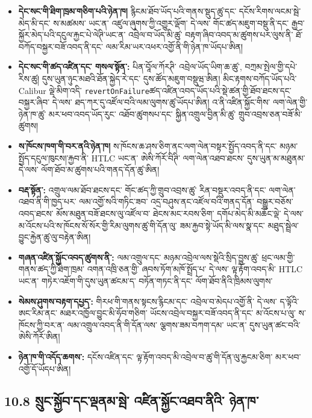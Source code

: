 \documentclass[11pt]{article}
\begin{document}
\begin{itemize}[leftmargin=*]
\item \textbf{དེང་སང་གི་ཐིག་ཁྲམ་གཅིག་པའི་ཉེན་ཁ།} རྙིངམ་ཐོབ་ཡོད་པའི་གནས་སྡུད་ཚུ་དང་ དངོས་རིགས་ལངམ་སྦེ་མེད་མི་དང་ ས་མཚམས་ ཡང་ན་ འཛུལ་ཞུགས་ཀྱི་འགྱུར་ལྡོག་ དེ་ལས་ གོང་ཚད་མཇུག་བསྡུ་ནི་དང་ རྒྱབ་སྐྱོར་མེད་པའི་དངུལ་རྐྱང་པེ་ལེཊི་ཡང་ན་ འབྲེལ་བ་ཡོད་མི་ཚུ་ བརྟག་ཞིབ་འབད་མ་ཚུགས་པར་ལུས་ནི་ ཐོ་བཀོད་བསྐྱར་བཟོ་འབད་ནི་དང་ ལམ་རིམ་ཡར་འཕར་འགྱོ་ནི་གི་ཉེན་ཁ་ཡོདཔ་ཨིན།
\item \textbf{དེང་སང་གི་ཚད་འཛིན་དང་ གསལ་སྟོན་:} པིན་བཱོལ་ཀོརཊི་ འབྲེལ་ཡོད་ཡིག་ཆ་ཚུ་, བཀྲམ་སྤེལ་གྱི་དཔེ་རིས་ཚུ། དུས་ཡུན་ཉུང་མཐའི་ཐོན་སྐྱེད་རེ་དང་ དུས་ཚོད་མཇུག་བསྡུཝ་ཨིན། མིང་རྟགས་བཀོད་ཡོད་པའི་ Calibur ལྡེ་མིག་འདི་ \texttt{revertOnFailure}ཚད་འཛིན་འབད་ཡོད་པའི་སྡེ་ཚན་གྱི་ཐོབ་ཐངས་དང་ བསྐྱར་ཞིབ་ དེ་ལས་ ཐད་ཀར་དུ་འཛོལ་བའི་ལམ་ལུགས་ཚུ་ཡོདཔ་ཨིན། འ་ནི་འཛིན་སྐྱོང་གིས་ ལག་ལེན་གྱི་ཉེན་ཁ་ཚུ་ མར་ཕབ་འབད་ཡོད་རུང་ འཐོབ་ཚུགསཔ་དང་ སྐྱིན་འགྲུལ་བྱིན་མི་ཚུ་ གྲུབ་འབྲས་ཅན་བཟོ་མི་ཚུགས།
\item \textbf{ས་ཁོངས་ཁག་གི་བར་ནའི་ཉེན་ཁ།} ས་ཁོངས་ཆ་ཤས་ཅིག་ནང་ལག་ལེན་བསྟར་སྤྱོད་འབད་ནི་དང་ མཉམ་སྤྱོད་དངུལ་ཁུངས།་རྐྱབ་ནི་ HTLC ཡང་ན་ ཨེསི་ཀོརོ་བིཊི་ ལག་ལེན་འཐབ་ཐངས་ དུས་ཡུན་མ་མཐུནམ་ དེ་ལས་ ལོག་ཐོབ་མ་ཚུགས་པའི་གནད་དོན་ཚུ་ཨིན།
\item \textbf{བརྡ་སྟོན་:} འགྲུལ་ལམ་ཐོབ་ཐངས་དང་ གོང་ཚད་ཀྱི་གྲུབ་འབྲས་ཚུ་ རིན་བསྡུར་འབད་ནི་དང་ ལག་ལེན་འཐབ་ནི་གི་ཁྱད་པར་ ལམ་འགྱོ་སའི་གཏིང་ཟབ་ འདྲ་བཤུས་ནང་འཛོལ་བའི་གནད་དོན་ བསྒྱུར་བཅོས་འབད་ཐངས་ མོས་མཐུན་བཟོ་ཐངས་ལུ་འཛོལ་བ་ ཐེངས་མང་རབས་ཅིག་ དགོཔ་མེད་མི་མཆོང་ལྡེ་ དེ་ལས་ མ་འོངས་པའི་ས་ཁོངས་སོ་སོར་གྱི་རིམ་ལུགས་ཚུ་གི་དོན་ལུ་ ཟམ་རྐྱབ་སྟེ་ཡོད་མི་ལས་སྣ་དང་ མཐུད་སྦྲེལ་བྱུང་རྐྱེན་ཚུ་ལུ་བརྟེན་ཨིན།
\item \textbf{གཞན་འཛིན་སྐྱོང་འབད་ཚུགས་ནི་:} ལམ་འགྲུལ་དང་ མཉམ་འབྲེལ་ལས་སྡེའི་སྲིད་བྱུས་ཚུ་ ཕྲང་ལམ་གྱི་གནས་ཚད་ཀྱི་ཐིག་ཁྲམ་ འགན་འཁྲི་ཅན་གྱི་ ཞབས་ཏོག་མཁོ་སྤྲོད་པ་ དེ་ལས་ ལྟ་རྟོག་འབད་མི་ HTLC ཡང་ན་ གཏེར་འཇོག་གི་དུས་ཡུན་ཚངམ་ད་ བཏོན་གཏང་ནི་དང་ ལོག་ཐོབ་ནིའི་ཁྲིམས་ལུགས་
\item \textbf{སེམས་ཤུགས་བརྟག་དཔྱད་:} གིརཕ་གི་གནས་སྟངས་རྙིངམ་དང་ འབྲེལ་བ་མེདཔ་འགྱོ་ནི་ དེ་ལས་ ད་ལྟོའི་ཨང་རིམ་ནང་ མཐར་འཁྱོལ་བྱུང་མི་ཧོབ་གཅིག་ ཡོངས་འབྲེལ་བསྐྱར་བཟོ་འབད་ནི་དང་ མ་འོངས་པ་ལུ་ ས་ཁོངས་ཀྱི་བར་ན་ ལམ་འགྲུལ་འབད་ནི་གི་དོན་ལས་ ལྕགས་ཟམ་བཀག་དམ་ ཡང་ན་ དུས་ཡུན་ཚང་བའི་ ཨེསི་ཀོརོ་ཨིན།
\item \textbf{ཉེན་ཁ་གི་འདོད་ཆགས་:} དངོས་འཛིན་དང་ ལྟ་རྟོག་འབད་མི་འབྲེལ་བ་ཚུ་གི་དོན་ལུ་རྐྱངམ་ཅིག་ མར་ཕབ་འགྱོ་དོ་ཡོདཔ་ཨིན།
\end{itemize}
\subsection*{10.8 སྲུང་སྐྱོབ་དང་ལྡནམ་སྦེ་ འཛིན་སྐྱོང་འཐབ་ནིའི་ ཉེན་ཁ་}
\end{document}
